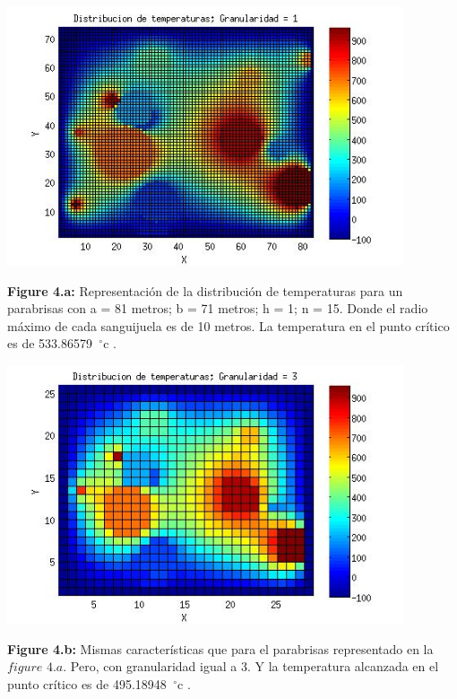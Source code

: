 \includegraphics[width=\textwidth,height=3.0in,keepaspectratio
]{82x71h1.jpg} \newline
\begin {flushleft}
\textbf{Figure 4.a:} Representación de la distribución de temperaturas para un parabrisas con a = 81 metros; b = 71 metros; h = 1; n = 15. Donde el radio máximo de cada sanguijuela es de 10 metros. La temperatura en el punto crítico es de 533.86579\hspace{-1.5mm}$\phantom{a}^{\circ}$c .
\end{flushleft}

\includegraphics[width=\textwidth,height=3.0in,keepaspectratio
]{82x71h3.jpg} \newline
\begin {flushleft}
\textbf{Figure 4.b:} Mismas características que para el parabrisas representado en la $figure$ $4.a$. Pero, con granularidad igual a 3. Y la temperatura alcanzada en el punto crítico es de 495.18948\hspace{-1.5mm}$\phantom{a}^{\circ}$c .
\end{flushleft}

